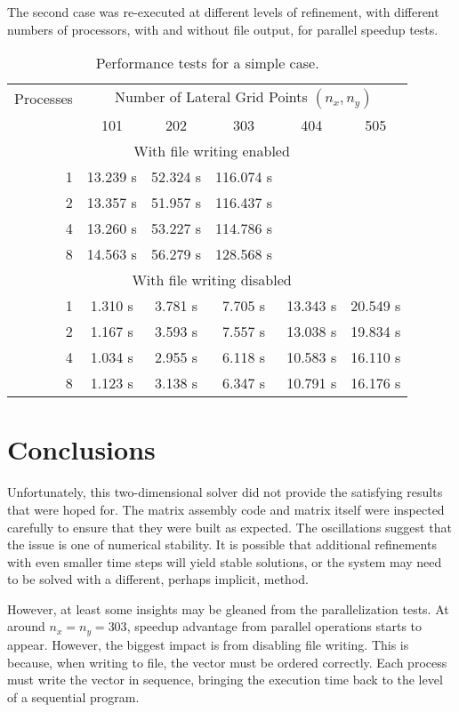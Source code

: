 \documentclass{article}
\begin{document}
The second case was re-executed at different levels of refinement, with different numbers of processors, with and without file output, for parallel speedup tests.

\begin{table}[h!]
	\centering
	\caption{Performance tests for a simple case.}
	\label{tbl:perftests}
	\begin{tabular}{r|ccccc}
		Processes & \multicolumn{5}{c}{Number of Lateral Grid Points $(n_{x}, n_{y})$} \\
		 & 101 & 202 & 303 & 404 & 505 \\
		\hline
		 & \multicolumn{4}{c}{With file writing enabled} \\
		\hline
		1 & 13.239 s & 52.324 s & 116.074 s &  &  \\
		2 & 13.357 s & 51.957 s & 116.437 s &  &  \\
		4 & 13.260 s & 53.227 s & 114.786 s &  &  \\
		8 & 14.563 s & 56.279 s & 128.568 s &  &  \\
		\hline
		 & \multicolumn{4}{c}{With file writing disabled} \\
		\hline
		1 & 1.310 s & 3.781 s & 7.705 s & 13.343 s & 20.549 s \\
		2 & 1.167 s & 3.593 s & 7.557 s & 13.038 s & 19.834 s \\
		4 & 1.034 s & 2.955 s & 6.118 s & 10.583 s & 16.110 s \\
		8 & 1.123 s & 3.138 s & 6.347 s & 10.791 s & 16.176 s
	\end{tabular}
\end{table}

\section{Conclusions}

Unfortunately, this two-dimensional solver did not provide the satisfying results that were hoped for. The matrix assembly code and matrix itself were inspected carefully to ensure that they were built as expected. The oscillations suggest that the issue is one of numerical stability. It is possible that additional refinements with even smaller time steps will yield stable solutions, or the system may need to be solved with a different, perhaps implicit, method.

However, at least some insights may be gleaned from the parallelization tests. At around $n_{x} = n_{y} = 303$, speedup advantage from parallel operations starts to appear. However, the biggest impact is from disabling file writing. This is because, when writing to file, the vector must be ordered correctly. Each process must write the vector in sequence, bringing the execution time back to the level of a sequential program.
\end{document}

